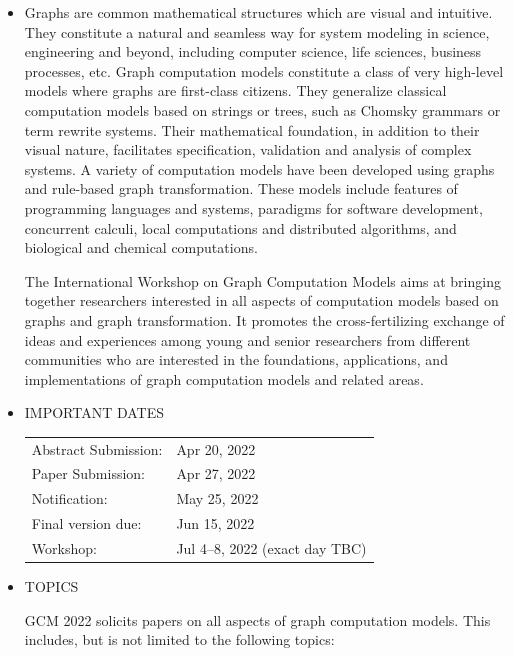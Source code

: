 \documentclass[prodmode,acmtecs]{acmsmall} %
\begin{document}
\begin{itemize}\item  Graphs are common mathematical structures which are visual and intuitive. They constitute a natural and seamless way for system modeling in science, engineering and beyond, including computer science, life sciences, business processes, etc. Graph computation models constitute a class of very high-level models where graphs are first-class citizens. They generalize classical computation models based on strings or trees, such as Chomsky grammars or term rewrite systems. Their mathematical foundation, in addition to their visual nature, facilitates specification, validation and analysis of complex systems. A variety of computation models have been developed using graphs and rule-based graph transformation. These models include features of programming languages and systems, paradigms for software development, concurrent calculi, local computations and distributed algorithms, and biological and chemical computations. 
 
  The International Workshop on Graph Computation Models aims at bringing together researchers interested in all aspects of computation models based on graphs and graph transformation. It promotes the cross-fertilizing exchange of ideas and experiences among young and senior researchers from different communities who are interested in the foundations, applications, and implementations of graph computation models and related areas. 
 
\item  IMPORTANT DATES 
 
\begin{tabulary}{\linewidth}{LL}Abstract Submission:  & Apr 20, 2022 \\
Paper Submission:  & Apr 27, 2022 \\
Notification:  & May 25, 2022 \\
Final version due:  & Jun 15, 2022 \\
Workshop:  & Jul 4–8, 2022 (exact day TBC) \\
\end{tabulary}
 
\item  TOPICS 
 
  GCM 2022 solicits papers on all aspects of graph computation models. This includes, but is not limited to the following topics: 
 

\end{itemize}
\end{document}
